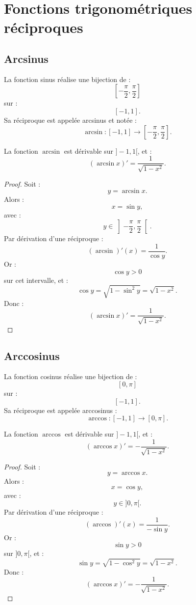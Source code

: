 \documentclass[11pt,a4paper]{article}
\begin{document}
\section{Fonctions trigonométriques réciproques}

\subsection{Arcsinus}

\begin{definitionbox}[Arcsinus]
La fonction sinus réalise une bijection de :
\[
\left[-\frac{\pi}{2},\frac{\pi}{2}\right]
\]
sur :
\[
[-1,1].
\]
Sa réciproque est appelée arcsinus et notée :
\[
\arcsin:[-1,1]\to\left[-\frac{\pi}{2},\frac{\pi}{2}\right].
\]
\end{definitionbox}

\begin{theorembox}
La fonction \(\arcsin\) est dérivable sur \(]-1,1[\), et :
\[
(\arcsin x)'=\frac1{\sqrt{1-x^2}}.
\]
\end{theorembox}

\begin{proof}
Soit :
\[
y=\arcsin x.
\]
Alors :
\[
x=\sin y,
\]
avec :
\[
y\in\left]-\frac{\pi}{2},\frac{\pi}{2}\right[.
\]
Par dérivation d'une réciproque :
\[
(\arcsin)'(x)=\frac1{\cos y}.
\]
Or :
\[
\cos y>0
\]
sur cet intervalle, et :
\[
\cos y=\sqrt{1-\sin^2 y}=\sqrt{1-x^2}.
\]
Donc :
\[
(\arcsin x)'=\frac1{\sqrt{1-x^2}}.
\]
\end{proof}

\subsection{Arccosinus}

\begin{definitionbox}[Arccosinus]
La fonction cosinus réalise une bijection de :
\[
[0,\pi]
\]
sur :
\[
[-1,1].
\]
Sa réciproque est appelée arccosinus :
\[
\arccos:[-1,1]\to[0,\pi].
\]
\end{definitionbox}

\begin{theorembox}
La fonction \(\arccos\) est dérivable sur \(]-1,1[\), et :
\[
(\arccos x)'=-\frac1{\sqrt{1-x^2}}.
\]
\end{theorembox}

\begin{proof}
Soit :
\[
y=\arccos x.
\]
Alors :
\[
x=\cos y,
\]
avec :
\[
y\in]0,\pi[.
\]
Par dérivation d'une réciproque :
\[
(\arccos)'(x)=\frac1{-\sin y}.
\]
Or :
\[
\sin y>0
\]
sur \(]0,\pi[\), et :
\[
\sin y=\sqrt{1-\cos^2 y}=\sqrt{1-x^2}.
\]
Donc :
\[
(\arccos x)'=-\frac1{\sqrt{1-x^2}}.
\]
\end{proof}
\end{document}
